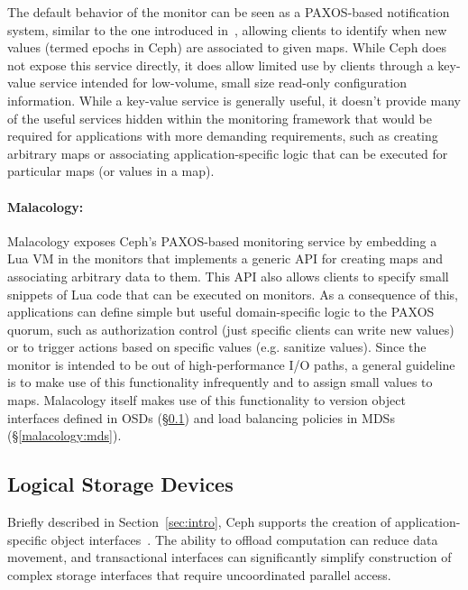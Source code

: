 \documentclass[10pt,twocolumn]{article}
\begin{document}
The default behavior of the monitor can be seen as a PAXOS-based notification 
system, similar to the one introduced in~\cite{burrows_chubby_2006}, allowing 
clients to identify when new values (termed epochs in Ceph) are associated to 
given maps. While Ceph does not expose this service directly, it does allow 
limited use by clients through a key-value service intended for low-volume, 
small size read-only configuration information. While a key-value service is 
generally useful, it doesn't provide many of the useful services hidden within 
the monitoring framework that would be required for applications with more 
demanding requirements, such as creating arbitrary maps or associating 
application-specific logic that can be executed for particular maps (or values 
in a map).

\paragraph*{Malacology:} Malacology exposes Ceph's PAXOS-based monitoring 
service by embedding a Lua VM in the monitors that implements a generic API for 
creating maps and associating arbitrary data to them. This API also allows 
clients to specify small snippets of Lua code that can be executed on monitors. 
As a consequence of this, applications can define simple but useful 
domain-specific logic to the PAXOS quorum, such as authorization control (just 
specific clients can write new values) or to trigger actions based on specific 
values (e.g. sanitize values). Since the monitor is intended to be out of 
high-performance I/O paths, a general guideline is to make use of this 
functionality infrequently and to assign small values to maps. Malacology itself 
makes use of this functionality to version object interfaces defined in OSDs 
(\S\ref{active-storage}) and load balancing policies in MDSs 
(\S\ref{malacology:mds}).

\subsection{Logical Storage Devices}
\label{active-storage}

Briefly described in Section~\ref{sec:intro}, Ceph supports the creation
of application-specific object interfaces~\cite{weil_rados_2007}. The ability
to offload computation can reduce data movement, and transactional interfaces can
significantly simplify construction of complex storage interfaces that require
uncoordinated parallel access. 
\end{document}
